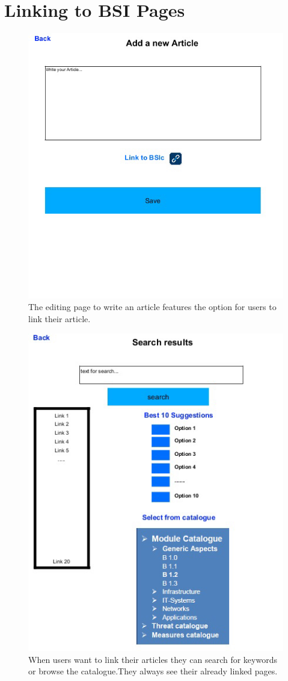 \section{Linking to BSI Pages}
\label{appendix_bsi_link}

\begin{figure}[h]  
    \centering
    \includegraphics[page=1,width=.8\textwidth]{Pictures/link_to_bsi_1.jpg}
    \caption{The editing page to write an article features the option for users to link their article.}
\end{figure}

\begin{figure}[h]  
    \centering
    \includegraphics[page=1,width=.8\textwidth]{Pictures/link_to_bsi_2.jpg}
    \caption{When users want to link their articles they can search for keywords or browse the catalogue.They always see their already linked pages. }
\end{figure}



